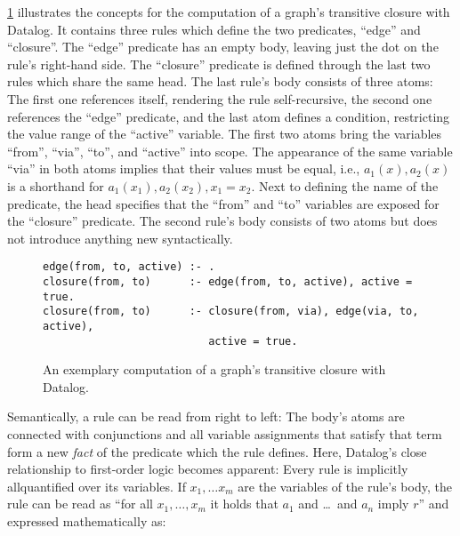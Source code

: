 \ref{code:trans-closure-datalog} illustrates the concepts for the
computation of a graph's transitive closure with Datalog.
It contains three rules which define the two predicates, ``edge'' and ``closure''.
The ``edge'' predicate has an empty body,
leaving just the dot on the rule's right-hand side.
The ``closure'' predicate is defined through the last two rules which share
the same head.
The last rule's body consists of three atoms: The first one references itself,
rendering the rule self-recursive, the second one references the ``edge'' predicate,
and the last atom defines a condition, restricting the value range of the
``active'' variable.
The first two atoms bring the variables ``from'', ``via'', ``to'', and ``active''
into scope.
The appearance of the same variable ``via'' in both atoms implies that their
values must be equal, i.e.,
\(a_1(x), a_2(x)\) is a shorthand for \(a_1(x_1), a_2(x_2), x_1 = x_2\).
Next to defining the name of the predicate, the head specifies that the ``from''
and ``to'' variables are exposed for the ``closure'' predicate.
The second rule's body consists of two atoms but does not introduce anything new
syntactically.

\begin{figure}[htpb]
	\centering
	\begin{lstlisting}[keepspaces]
edge(from, to, active) :- .
closure(from, to)      :- edge(from, to, active), active = true.
closure(from, to)      :- closure(from, via), edge(via, to, active),
                          active = true.\end{lstlisting}
	\caption{An exemplary computation of a graph's transitive closure with Datalog.}\label{code:trans-closure-datalog}
\end{figure}

Semantically, a rule can be read from right to left: The body's atoms are
connected with conjunctions and all variable assignments that satisfy that term
form a new \emph{fact} of the predicate which the rule defines.
Here, Datalog's close relationship to first-order logic becomes apparent:
Every rule is implicitly allquantified over its variables.
If \(x_1, \ldots x_m\) are the variables of the rule's body, the rule can be read as
``for all \(x_1, \ldots, x_m\) it holds that \(a_1\) and \ldots\ and \(a_n\) imply \(r\)''
and expressed\footnotemark{} mathematically as:


